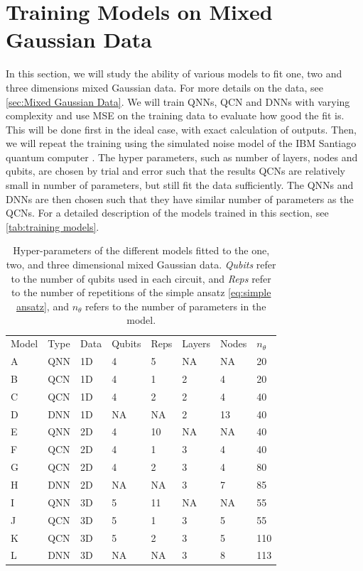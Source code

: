 \section{Training Models on Mixed Gaussian Data}\label{sec:Training Models}
In this section, we will study the ability of various models to fit one, two and three dimensions mixed Gaussian data. For more details on the data, see \autoref{sec:Mixed Gaussian Data}. We will train QNNs, QCN and DNNs with varying complexity and use MSE on the training data to evaluate how good the fit is. This will be done first in the ideal case, with exact calculation of outputs. Then, we will repeat the training using the simulated noise model of the IBM Santiago quantum computer \cite{santiago}. The hyper parameters, such as number of layers, nodes and qubits, are chosen by trial and error such that the results QCNs are relatively small in number of parameters, but still fit the data sufficiently. The QNNs and DNNs are then chosen such that they have similar number of parameters as the QCNs.  For a detailed description of the models trained in this section, see \autoref{tab:training models}.

\begin{table}[H]
\centering
\caption{Hyper-parameters of the different models fitted to the one, two, and three dimensional mixed Gaussian data. \emph{Qubits} refer to the number of qubits used in each circuit, and \emph{Reps} refer to the number of repetitions of the simple ansatz \autoref{eq:simple ansatz}, and $n_{\theta}$ refers to the number of parameters in the model.} 
\begin{tabular}{|l|l|l|l|l|l|l|l|}
\hline
Model& Type& Data& Qubits& Reps& Layers & Nodes &$n_{\theta}$ \\ \Xhline{3\arrayrulewidth}
A    & QNN & 1D  & 4     & 5&NA     & NA& 20   \\ \hline
B    & QCN & 1D  & 4     & 1&2      & 4& 20 \\ \hline
C    & QCN & 1D  & 4     & 2&2      & 4& 40  \\ \hline
D    & DNN & 1D  & NA    & NA&2      & 13& 40  \\ \Xhline{3\arrayrulewidth}
E    & QNN & 2D  & 4     & 10&NA     & NA& 40  \\ \hline
F    & QCN & 2D  & 4     & 1&3      & 4& 40  \\ \hline
G    & QCN & 2D  & 4     & 2&3      & 4& 80  \\ \hline
H    & DNN & 2D  & NA    & NA&3      & 7& 85  \\ \Xhline{3\arrayrulewidth}
I    & QNN & 3D  & 5     & 11&NA     & NA& 55  \\ \hline
J    & QCN & 3D  & 5     & 1&3      & 5& 55  \\ \hline
K    & QCN & 3D  & 5     & 2&3      & 5& 110  \\ \hline
L    & DNN & 3D  & NA    & NA&3      & 8& 113  \\ \hline
\end{tabular}

\label{tab:training models}
\end{table}


